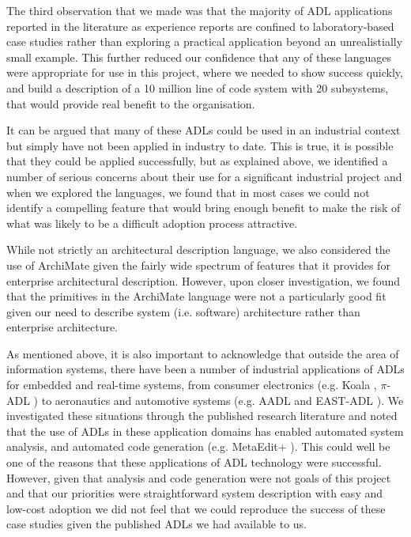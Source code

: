 The third observation that we made was that the majority of ADL applications reported in the literature as experience reports are confined to laboratory-based case studies rather than exploring a practical application beyond an unrealistially small example.  This further reduced our confidence that any of these languages were appropriate for use in this project, where we needed to show success quickly, and build a description of a 10 million line of code system with 20 subsystems, that would provide real benefit to the organisation.

It can be argued that many of these ADLs could be used in an industrial context but simply have not been applied in industry to date.  This is true, it is possible that they could be applied successfully, but as explained above, we identified a number of serious concerns about their use for a significant industrial project and when we explored the languages, we found that in most cases we could not identify a compelling feature that would bring enough benefit to make the risk of what was likely to be a difficult adoption process attractive.

While not strictly an architectural description language, we also considered the use of ArchiMate \cite{lankhorst2009-archimate} given the fairly wide spectrum of features that it provides for enterprise architectural description. However, upon closer investigation, we found that the primitives in the ArchiMate language were not a particularly good fit given our need to describe system (i.e. software) architecture rather than enterprise architecture.

As mentioned above, it is also important to acknowledge that outside the area of information systems, there have been a number of industrial applications of ADLs for embedded and real-time systems, from consumer electronics (e.g. Koala \cite{vanommering2000-koala}, $\pi$-ADL \cite{oquendo2004-piadl}) to aeronautics and automotive systems (e.g. AADL \cite{sae2009-aadl} and EAST-ADL \cite{cuenot2010-east}). We investigated these situations through the published research literature and noted that the use of ADLs in these application domains has enabled automated system analysis, and automated code generation (e.g. MetaEdit+ \cite{smolander1991-metaedit}). This could well be one of the reasons that these applications of ADL technology were successful.  However, given that analysis and code generation were not goals of this project and that our priorities were straightforward system description with easy and low-cost adoption we did not feel that we could reproduce the success of these case studies given the published ADLs we had available to us.

